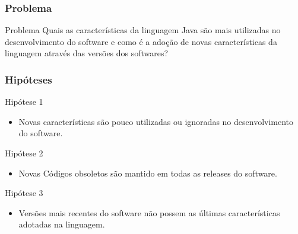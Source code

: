 \documentclass[]{beamer}
\begin{document}
	\begin{frame}[fragile]\frametitle{Problema}
		\begin{block}{Problema}
			Quais as características da linguagem Java são mais utilizadas no desenvolvimento do software e como é a adoção de novas características da linguagem através das versões dos softwares?
		\end{block}
	\end{frame}	
	
	
	\begin{frame}[fragile]\frametitle{Hipóteses}
		
		\begin{block}{Hipótese 1}
			\begin{itemize}
				\item Novas características são pouco utilizadas ou ignoradas no desenvolvimento do software.
			\end{itemize}
		
		\end{block}
		
		\begin{block}{Hipótese 2}
			\begin{itemize}
				\item Novas Códigos obsoletos são mantido em todas as releases do software.
			\end{itemize}
		\end{block}
		
		\begin{block}{Hipótese 3}
			\begin{itemize}
				\item Versões mais recentes do software não possem as últimas características adotadas na linguagem.
			\end{itemize}
		\end{block}
		
	\end{frame}
	
\end{document}
